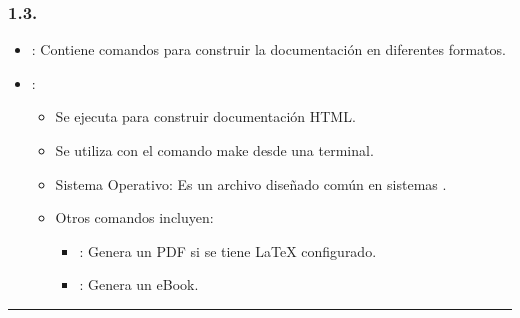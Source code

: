 \documentclass[a4paper,10pt,spanish]{sphinxmanual}
\begin{document}
\subsubsection{1.3. }
\label{\detokenize{configuracion_inicial/004.estructura_inicial_proyecto:archivo-makefile}}\begin{itemize}
\item {} 
\sphinxAtStartPar
{}: Contiene comandos para construir la documentación en diferentes formatos.

\item {} 
\sphinxAtStartPar
{}:
\begin{itemize}
\item {} 
\sphinxAtStartPar
Se ejecuta  para construir documentación HTML.

\item {} 
\sphinxAtStartPar
Se utiliza con el comando make desde una terminal.

\item {} 
\sphinxAtStartPar
Sistema Operativo: Es un archivo diseñado común en sistemas .

\item {} 
\sphinxAtStartPar
Otros comandos incluyen:
\begin{itemize}
\item {} 
\sphinxAtStartPar
{}: Genera un PDF si se tiene LaTeX configurado.

\item {} 
\sphinxAtStartPar
{}: Genera un eBook.

\end{itemize}

\end{itemize}

\end{itemize}


\bigskip\hrule\bigskip
\end{document}
